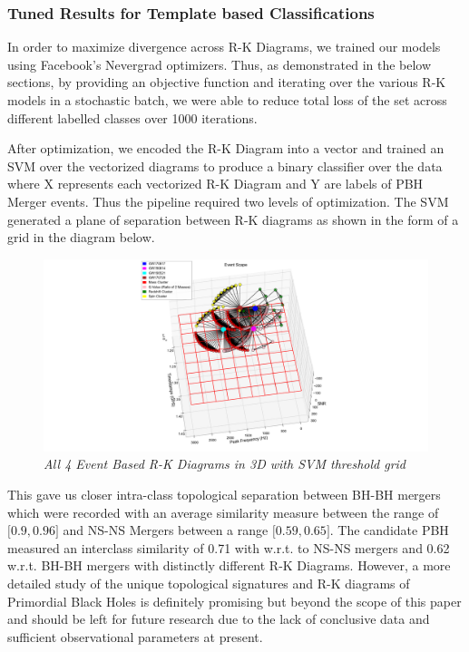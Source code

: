 \subsubsection{Tuned Results for Template based Classifications}

In order to maximize divergence across R-K Diagrams, we trained our models using Facebook's Nevergrad \cite{a2020_nevergrad} optimizers. Thus, as demonstrated in the below sections, by providing an objective function and iterating over the various R-K models in a stochastic batch, we were able to reduce total loss of the set across different labelled classes over 1000 iterations.

After optimization, we encoded the R-K Diagram into a vector and trained an SVM over the vectorized diagrams to produce a binary classifier over the data where X represents each vectorized R-K Diagram and Y are labels of PBH Merger events. Thus the pipeline required two levels of optimization. The SVM generated a plane of separation between R-K diagrams as shown in the form of a grid in the diagram below.

    \begin{figure}[H]
        \centering
 	\includegraphics[width=1.0\linewidth]{images/75_34_All-4-Diagrmas-in-3D_with-SNR_3.png}
 	\caption{\textit{All 4 Event Based R-K Diagrams in 3D with SVM threshold grid}}
 	\label{fig:LIGO16_PlaceHolder_fig}
 \end{figure}

This gave us closer intra-class topological separation between BH-BH mergers which were recorded with an average similarity measure between the range of $\lbrack0.9, 0.96\rbrack$ and NS-NS Mergers between a range   $\lbrack0.59, 0.65\rbrack$. The candidate PBH measured an interclass similarity of 0.71 with w.r.t. to NS-NS mergers and 0.62 w.r.t. BH-BH mergers with distinctly different R-K Diagrams. However, a more detailed study of the unique topological signatures and R-K diagrams of Primordial Black Holes is definitely promising but beyond the scope of this paper and should be left for future research due to the lack of conclusive data and sufficient observational parameters at present.

